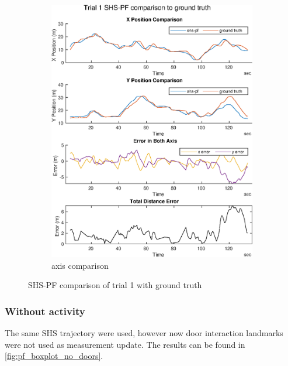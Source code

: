 \begin{figure}[H]
\begin{subfigure}[t]{.45\textwidth}
		\includegraphics[width=\linewidth]{images/20201029_1603_shs-pf_trial_1_1}
		\caption{axis comparison}
		\label{fig:shspf_trial1_comparison}
	\end{subfigure}
	\setlength{\belowcaptionskip}{-20pt}
	\caption{SHS-PF comparison of trial 1 with ground truth}
	\label{fig:shspf_trial1_shs_gt_comparison}
\end{figure}




\subsubsection{Without activity}
The same SHS trajectory were used, however now door interaction landmarks were not used as measurement update. The results can be found in \cref{fig:pf_boxplot_no_doors}.

